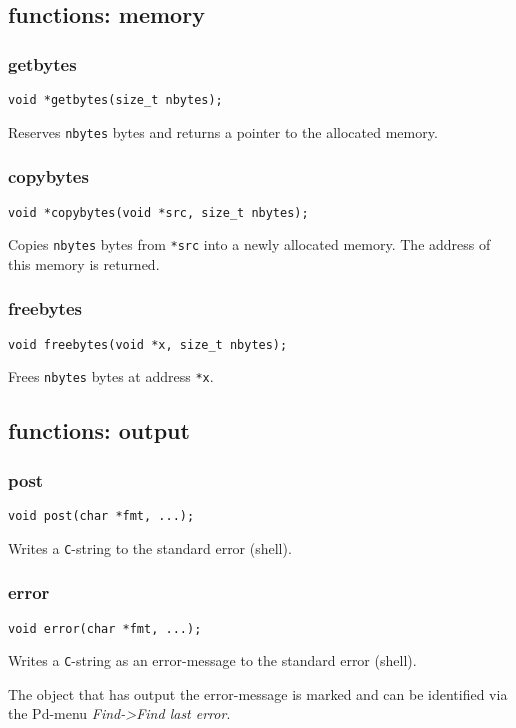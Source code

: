 \documentclass[12pt, a4paper,english,titlepage]{article}
\begin{document}
\begin{appendix}
\subsection{functions: memory}
\subsubsection{getbytes}
\begin{verbatim}
void *getbytes(size_t nbytes);
\end{verbatim}
Reserves \verb+nbytes+ bytes and returns a pointer to the allocated memory.

\subsubsection{copybytes}
\begin{verbatim}
void *copybytes(void *src, size_t nbytes);
\end{verbatim}
Copies \verb+nbytes+ bytes from \verb+*src+ into a newly allocated memory.
The address of this memory is returned.

\subsubsection{freebytes}
\begin{verbatim}
void freebytes(void *x, size_t nbytes);
\end{verbatim}
Frees \verb+nbytes+ bytes at address \verb+*x+.

\subsection{functions: output}
\subsubsection{post}
\begin{verbatim}
void post(char *fmt, ...);
\end{verbatim}

Writes a {\tt C}-string to the standard error (shell).

\subsubsection{error}
\begin{verbatim}
void error(char *fmt, ...);
\end{verbatim}

Writes a {\tt C}-string as an error-message to the standard error (shell).

The object that has output the error-message is marked and
can be identified via the Pd-menu {\em Find->Find last error}.

\end{appendix}
\end{document}
